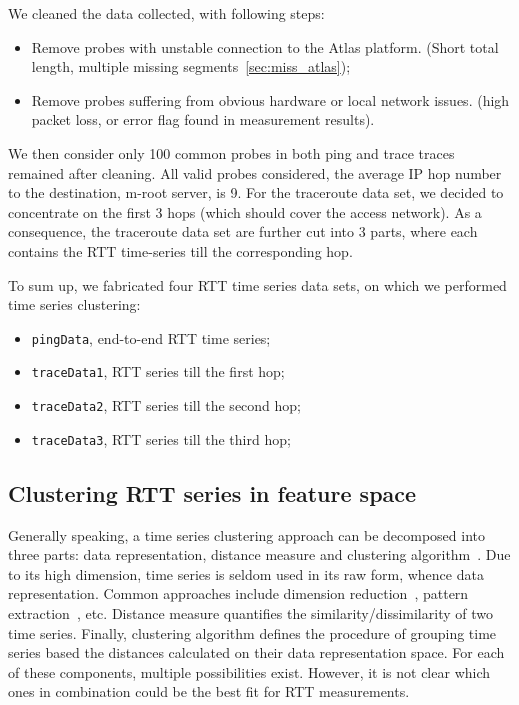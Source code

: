 We cleaned the data collected, with following steps:
\begin{itemize}
\item Remove probes with unstable connection to the Atlas platform. (Short total length, multiple missing segments~\ref{sec:miss_atlas});
\item Remove probes suffering from obvious hardware or local network issues. (high packet loss, or error flag found in measurement results).
\end{itemize}

We then consider only 100 common probes in both ping and trace traces remained after cleaning.
All valid probes considered, the average IP hop number to the destination, m-root server, is 9. 
For the traceroute data set, we decided to concentrate on the first 3 hops (which should cover the access network). As a consequence, the traceroute data set are further cut into 3 parts, where each contains the RTT time-series till the corresponding hop.

To sum up, we fabricated four RTT time series data sets, on which we performed time series clustering:
\begin{itemize}
\item \texttt{pingData}, end-to-end RTT time series;
\item \texttt{traceData1}, RTT series till the first hop;
\item \texttt{traceData2}, RTT series till the second hop;
\item \texttt{traceData3}, RTT series till the third hop;
\end{itemize}

\subsection{Clustering RTT series in feature space}
\label{sec:cls_ft}
Generally speaking, a time series clustering approach can be decomposed into three parts: data representation, distance measure and clustering algorithm~\cite{Aghabozorgi2015}. 
Due to its high dimension, time series is seldom used in its raw form, whence data representation.
Common approaches include dimension reduction~\cite{Elhamifar2013}, pattern extraction~\cite{Ulanova2015}, etc.
Distance measure quantifies the similarity/dissimilarity of two time series. Finally, clustering algorithm defines the procedure of grouping time series based the distances calculated on their data representation space.
For each of these components, multiple possibilities exist. However, it is not clear which ones in combination could be the best fit for RTT measurements. 


